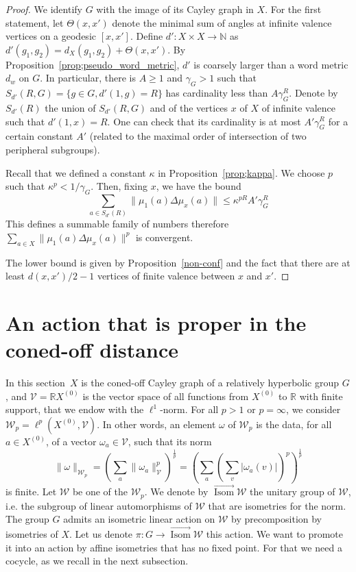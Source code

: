 \documentclass[11pt]{article}
\theoremstyle{definition}
\numberwithin{equation}{section}
\DeclareMathOperator{\Isom}{Isom}
\begin{document}
\begin{proof}
We identify $G$ with the image of its Cayley graph in $X$. For the first statement, let $\Theta(x,x')$ denote the minimal sum of angles at infinite valence vertices on a geodesic $[x,x']$. Define $d': X\times X \to \mathbb{N}$ as $d'(g_1,g_2) = d_X(g_1,g_2) + \Theta(x,x')$. By Proposition~\ref{prop;pseudo_word_metric}, $d'$ is coarsely larger than a word metric $d_w$ on $G$. In particular, there is $A\geq 1$ and $ \gamma_G >1 $ such that $S_{d'}(R,G) = \{ g\in G, d'(1,g) = R\}$ has cardinality less than $A\gamma_G^R$. Denote by $S_{d'}(R)$ the union of $S_{d'}(R,G) $ and of the vertices $x$ of $X$ of infinite valence such that $d'(1,x)= R$. One can check that its cardinality is at most $A' \gamma_G^R$ for a certain constant $A'$ (related to the maximal order of intersection of two peripheral subgroups).

Recall that we defined a constant $\kappa$ in Proposition~\ref{prop;kappa}. We choose $p$ such that $\kappa^p< 1/\gamma_G$. Then, fixing $x$, we have the bound
\[
\sum_{a\in S_{d'}(R)} \| \mu_1(a) \Delta \mu_{x}(a) \| \leq
\kappa^{p R} A' \gamma_G^{ R}
\]
This defines a summable family of numbers therefore $\sum_{a\in X} \| \mu_1(a) \Delta \mu_{x}(a) \|^p $ is convergent.


The lower bound is given by Proposition~\ref{non-conf} and the fact that there are at least $d(x,x')/2 - 1$ vertices of finite valence between $x$ and $x'$.
\end{proof}


\section{An action that is proper in the coned-off distance}\label{proper_in_CO}

In this section~$X$ is the coned-off Cayley graph of a relatively hyperbolic group $G$, and $\mathscr{V}=\mathbb{R}X^{(0)}$ is the vector space of all functions from $X^{(0)}$ to $\mathbb{R}$ with finite support, that we endow with the $\ell^1$-norm. For all $p >1$ or $p=\infty$, we consider $\mathscr{W}_p= \ell^p(X^{(0)},
\mathscr{V})$. In other words, an element $\omega$ of $\mathscr{W}_p$ is the data, for all $a\in X^{(0)}$, of a vector $\omega_a\in \mathscr{V}$, such that its norm
\[
\| \omega \|_{\mathscr{W}_p} = \left(\sum_a \| \omega_a \|^p_{\mathscr{V}}
\right)^{\frac1p} = \left(\sum_a \left(\sum_v |\omega_a(v)|
\right)^p \right)^{\frac1p}
\]
is finite. Let $ {\mathscr{W}} $ be one of the ${\mathscr{W}}_p$. We denote by $\overrightarrow{{\Isom}} {\mathscr{W}}$ the unitary group of ${\mathscr{W}}$, i.e. the subgroup of linear automorphisms of ${\mathscr{W}} $ that are isometries for the norm. The group $G$ admits an isometric linear action on ${\mathscr{W}} $ by precomposition by isometries of $X$. Let us denote $\pi: G\to \overrightarrow{{\Isom}} {\mathscr{W}} $ this action. We want to promote it into an action by affine isometries that has no fixed point. For that we need a cocycle, as we recall in the next subsection.
\end{document}
